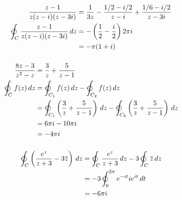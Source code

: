 \documentclass{article}
\begin{document}
\begin{align*}
  \frac{z - 1}{z (z - i) (z - 3 i)}                              & = \frac{1}{3 z} - \frac{1/2 - i / 2}{z - i} + \frac{1 / 6 - i / 2}{z - 3 i} \\
  \varointctrclockwise_C \frac{z - 1}{z (z - i) (z - 3 i)} \,d z & = -\left( \frac{1}{2} - \frac{i}{2} \right) 2 \pi i                         \\
                                                                 & = -\pi (1 + i)
\end{align*}

\setcounter{subsubsection}{20}
\subsubsection{}

\begin{align*}
  \frac{8 z - 3}{z^2 - z}           & = \frac{3}{z} + \frac{5}{z - 1}                                                                                                                                 \\
  \varointctrclockwise_C f(z) \,d z & = \varointctrclockwise_{C_1} f(z) \,d z - \varointctrclockwise_{C_2} f(z) \,d z                                                                                 \\
                                    & = \varointctrclockwise_{C_1} \left( \frac{3}{z} + \frac{5}{z - 1} \right) \,d z - \varointctrclockwise_{C_2} \left( \frac{3}{z} + \frac{5}{z - 1} \right) \,d z \\
                                    & = 6 \pi i - 10 \pi i                                                                                                                                            \\
                                    & = -4 \pi i
\end{align*}

\setcounter{subsubsection}{22}
\subsubsection{}

\begin{align*}
  \varointctrclockwise_C \left( \frac{e^z}{z + 3} - 3 \overline{z} \right) \,d z & = \varointctrclockwise_C \frac{e^z}{z + 3} \,d z - 3 \varointctrclockwise_C \overline{z} \,d z \\
                                                                                 & = -3 \varointctrclockwise_0^{2 \pi} e^{-i t} i e^{i t} \,d t                                   \\
                                                                                 & = -6 \pi i
\end{align*}
\end{document}
